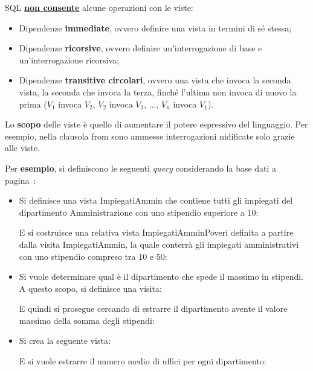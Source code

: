 \documentclass[a4paper]{article}
\begin{document}
	\noindent
	SQL \textbf{\underline{non consente}} alcune operazioni con le viste:
	\begin{itemize}
		\item Dipendenze \textbf{immediate}, ovvero definire una vista in termini di sé stessa;
		
		\item Dipendenze \textbf{ricorsive}, ovvero definire un'interrogazione di base e un'interrogazione ricorsiva;
		
		\item Dipendenze \textbf{transitive circolari}, ovvero una vista che invoca la seconda vista, la seconda che invoca la terza, finché l'ultima non invoca di nuovo la prima ($V_{1}$ invoca $V_{2}$, $V_{2}$ invoca $V_{3}$, ..., $V_{n}$ invoca $V_{1}$).
	\end{itemize}
	Lo \textbf{scopo} delle viste è quello di aumentare il potere espressivo del linguaggio. Per esempio, nella clausola \textsf{from} sono ammesse interrogazioni nidificate solo grazie alle viste.\newline
	
	\noindent
	Per \textcolor{Green4}{\textbf{esempio}}, si definiscono le seguenti \emph{query} considerando la base dati a pagina~\pageref{select dbms}:
	\begin{itemize}
		\item Si definisce una vista \textsf{ImpiegatiAmmin} che contiene tutti gli impiegati del dipartimento Amministrazione con uno stipendio superiore a 10:
		
		E si costruisce una relativa vista \textsf{ImpiegatiAmminPoveri} definita a partire dalla visita \textsf{ImpiegatiAmmin}, la quale conterrà gli impiegati amministrativi con uno stipendio compreso tra 10 e 50:
		\newpage
		
		\item Si vuole determinare qual è il dipartimento che spede il massimo in stipendi. A questo scopo, si definisce una visita:
		
		E quindi si prosegue cercando di estrarre il dipartimento avente il valore massimo della somma degli stipendi:
		
		
		\item Si crea la seguente vista:
		
		E si vuole estrarre il numero medio di uffici per ogni dipartimento:
		
	\end{itemize}\newpage
	
\end{document}
